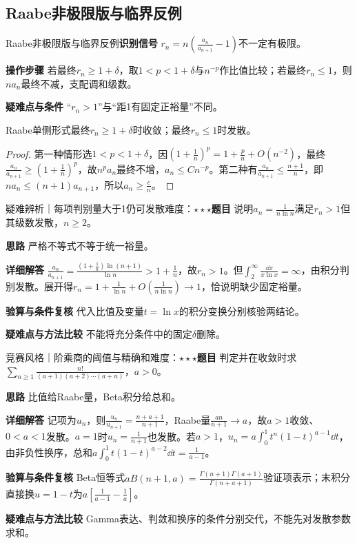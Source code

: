 \subsection{Raabe非极限版与临界反例}\label{ic:delta_series:raabemargin}\begin{method}{Raabe非极限版与临界反例}\textbf{识别信号} $r_n=n(\frac{a_n}{a_{n+1}}-1)$不一定有极限。\par \textbf{操作步骤} 若最终$r_n\ge1+\delta$，取$1<p<1+\delta$与$n^{-p}$作比值比较；若最终$r_n\le1$，则$na_n$最终不减，支配调和级数。\par \textbf{疑难点与条件} “$r_n>1$”与“距1有固定正裕量”不同。\end{method}

\begin{theorem}{Raabe单侧形式}最终$r_n\ge1+\delta$时收敛；最终$r_n\le1$时发散。\end{theorem}\begin{proof}第一种情形选$1<p<1+\delta$，因$(1+\frac{1}{n})^p=1+\frac{p}{n}+O(n^{-2})$，最终$\frac{a_n}{a_{n+1}}\ge(1+\frac{1}{n})^p$，故$n^pa_n$最终不增，$a_n\le Cn^{-p}$。第二种有$\frac{a_n}{a_{n+1}}\le\frac{n+1}{n}$，即$na_n\le(n+1)a_{n+1}$，所以$a_n\ge \frac{c}{n}$。\end{proof}

\begin{example}{疑难辨析｜每项判别量大于1仍可发散}{难度：$\star\star\star$}\label{ic:ex:delta_series:raabecounter}\textbf{题目} 说明$a_n=\frac{1}{n\ln n}$满足$r_n>1$但其级数发散，$n\ge2$。\par \textbf{思路} 严格不等式不等于统一裕量。\par \textbf{详细解答} $\frac{a_n}{a_{n+1}}=\frac{(1+\frac{1}{n})\ln(n+1)}{\ln n}>1+\frac{1}{n}$，故$r_n>1$。但$\int_2^\infty\frac{\dd x}{x\ln x}=\infty$，由积分判别发散。展开得$r_n=1+\frac{1}{\ln n}+O(\frac{1}{n\ln n})\to1$，恰说明缺少固定裕量。\par \textbf{验算与条件复核} 代入比值及变量$t=\ln x$的积分变换分别核验两结论。\par \textbf{疑难点与方法比较} 不能将充分条件中的固定$\delta$删除。\end{example}

\begin{example}{竞赛风格｜阶乘商的阈值与精确和}{难度：$\star\star\star$}\label{ic:ex:delta_series:factorialparameter}\textbf{题目} 判定并在收敛时求$\sum_{n\ge1}\frac{n!}{(a+1)(a+2)\cdots(a+n)}$，$a>0$。\par \textbf{思路} 比值给Raabe量，Beta积分给总和。\par \textbf{详细解答} 记项为$u_n$，则$\frac{u_n}{u_{n+1}}=\frac{n+a+1}{n+1}$，Raabe量$\frac{an}{n+1}\to a$，故$a>1$收敛、$0<a<1$发散。$a=1$时$u_n=\frac{1}{n+1}$也发散。若$a>1$，$u_n=a\int_0^1t^n(1-t)^{a-1}\dd t$，由非负性换序，总和$a\int_0^1t(1-t)^{a-2}\dd t=\frac{1}{a-1}$。\par \textbf{验算与条件复核} Beta恒等式$aB(n+1,a)=\frac{\Gamma(n+1)\Gamma(a+1)}{\Gamma(n+a+1)}$验证项表示；末积分直接换$u=1-t$为$a[\frac{1}{a-1}-\frac{1}{a}]$。\par \textbf{疑难点与方法比较} Gamma表达、判敛和换序的条件分别交代，不能先对发散参数求和。\end{example}

